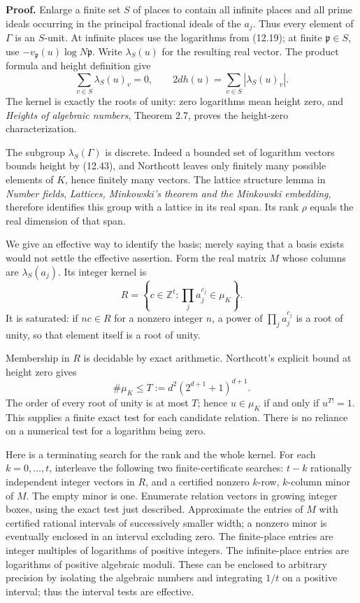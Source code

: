 \documentclass[
  11pt,
  a4paper,
]{article}
\begin{document}
\textbf{Proof.} Enlarge a finite set \(S\) of places to contain all
infinite places and all prime ideals occurring in the principal
fractional ideals of the \(a_j\). Thus every element of \(\Gamma\) is an
\(S\)-unit. At infinite places use the logarithms from (12.19); at
finite \(\mathfrak p\in S\), use
\(-v_{\mathfrak p}(u)\log N\mathfrak p\). Write \(\lambda_S(u)\) for the
resulting real vector. The product formula and height definition give \[
\sum_{v\in S}\lambda_S(u)_v=0,\qquad
2d h(u)=\sum_{v\in S}|\lambda_S(u)_v|.
\tag{12.43}
\] The kernel is exactly the roots of unity: zero logarithms mean height
zero, and \emph{Heights of algebraic numbers}, Theorem 2.7, proves the
height-zero characterization.

The subgroup \(\lambda_S(\Gamma)\) is discrete. Indeed a bounded set of
logarithm vectors bounds height by (12.43), and Northcott leaves only
finitely many possible elements of \(K\), hence finitely many vectors.
The lattice structure lemma in \emph{Number fields}, \emph{Lattices,
Minkowski's theorem and the Minkowski embedding}, therefore identifies
this group with a lattice in its real span. Its rank \(\rho\) equals the
real dimension of that span.

We give an effective way to identify the basis; merely saying that a
basis exists would not settle the effective assertion. Form the real
matrix \(M\) whose columns are \(\lambda_S(a_j)\). Its integer kernel is
\[
R=\left\{c\in\mathbb Z^t:
                  \prod_j a_j^{c_j}\in\mu_K\right\}.
\tag{12.44}
\] It is saturated: if \(nc\in R\) for a nonzero integer \(n\), a power
of \(\prod_j a_j^{c_j}\) is a root of unity, so that element itself is a
root of unity.

Membership in \(R\) is decidable by exact arithmetic. Northcott's
explicit bound at height zero gives \[
\#\mu_K\le T:=d^2(2^{d+1}+1)^{d+1}.
\] The order of every root of unity is at most \(T\); hence
\(u\in\mu_K\) if and only if \(u^{T!}=1\). This supplies a finite exact
test for each candidate relation. There is no reliance on a numerical
test for a logarithm being zero.

Here is a terminating search for the rank and the whole kernel. For each
\(k=0,\ldots,t\), interleave the following two finite-certificate
searches: \(t-k\) rationally independent integer vectors in \(R\), and a
certified nonzero \(k\)-row, \(k\)-column minor of \(M\). The empty
minor is one. Enumerate relation vectors in growing integer boxes, using
the exact test just described. Approximate the entries of \(M\) with
certified rational intervals of successively smaller width; a nonzero
minor is eventually enclosed in an interval excluding zero. The
finite-place entries are integer multiples of logarithms of positive
integers. The infinite-place entries are logarithms of positive
algebraic moduli. These can be enclosed to arbitrary precision by
isolating the algebraic numbers and integrating \(1/t\) on a positive
interval; thus the interval tests are effective.
\end{document}
